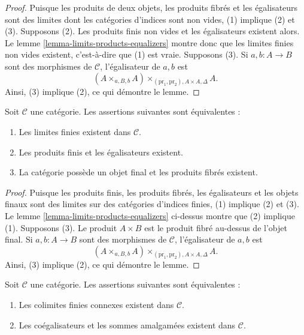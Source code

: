 \begin{proof}
Puisque les produits de deux objets, les produits fibrés et les égalisateurs
sont des limites dont les catégories d'indices sont non vides, (1) implique
(2) et (3). Supposons (2). Les produits finis non vides et les égalisateurs
existent alors. Le lemme \ref{lemma-limits-products-equalizers}
montre donc que les limites finies non vides existent, c'est-à-dire que
(1) est vraie. Supposons (3).
Si $a, b : A \to B$ sont des morphismes de $\mathcal{C}$, l'égalisateur
de $a, b$ est
$$
(A \times_{a, B, b} A)\times_{(\text{pr}_1, \text{pr}_2), A \times A, \Delta} A.
$$
Ainsi, (3) implique (2), ce qui démontre le lemme.
\end{proof}

\begin{lemma}
\label{lemma-finite-limits-exist}
Soit $\mathcal{C}$ une catégorie.
Les assertions suivantes sont équivalentes :
\begin{enumerate}
\item Les limites finies existent dans $\mathcal{C}$.
\item Les produits finis et les égalisateurs existent.
\item La catégorie possède un objet final et les produits fibrés existent.
\end{enumerate}
\end{lemma}

\begin{proof}
Puisque les produits finis, les produits fibrés, les égalisateurs et les
objets finaux sont des limites sur des catégories d'indices finies, (1)
implique (2) et (3). Le lemme \ref{lemma-limits-products-equalizers}
ci-dessus montre que (2) implique (1). Supposons (3).
Le produit $A \times B$ est le produit fibré au-dessus de l'objet final.
Si $a, b : A \to B$ sont des morphismes de $\mathcal{C}$, l'égalisateur
de $a, b$ est
$$
(A \times_{a, B, b} A)\times_{(\text{pr}_1, \text{pr}_2), A \times A, \Delta} A.
$$
Ainsi, (3) implique (2), ce qui démontre le lemme.
\end{proof}

\begin{lemma}
\label{lemma-push-outs-coequalizers-exist}
Soit $\mathcal{C}$ une catégorie.
Les assertions suivantes sont équivalentes :
\begin{enumerate}
\item Les colimites finies connexes existent dans $\mathcal{C}$.
\item Les coégalisateurs et les sommes amalgamées existent dans $\mathcal{C}$.
\end{enumerate}
\end{lemma}

